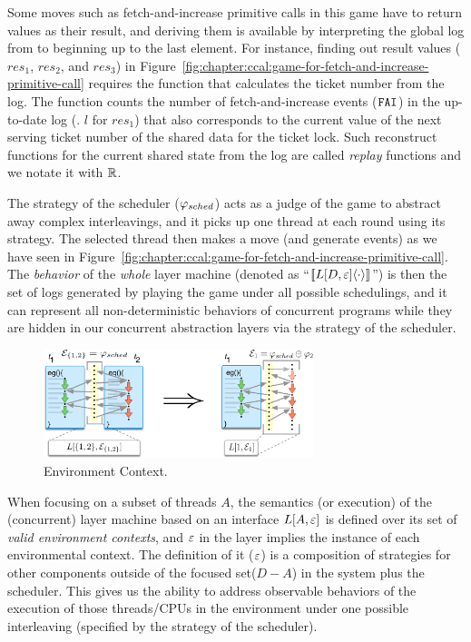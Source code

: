 Some moves such as fetch-and-increase primitive calls in this game have to return values as their result,
and deriving them is available by interpreting the global log from to beginning up to the last element. 
For instance, finding out result values ($res_1$, $res_2$, and $res_3$) in Figure~\ref{fig:chapter:ccal:game-for-fetch-and-increase-primitive-call}
requires the function that calculates the ticket number from the log.
The function counts the number of fetch-and-increase events (${\mathrm{\texttt{FAI}}}$) in the up-to-date log (\eg. $l$ for $res_1$) that
also corresponds to the current value of the next serving ticket number of the shared data for the ticket lock.
Such reconstruct functions for the current shared state from the log are called \emph{replay} functions and we notate it with $\mathbb{R}$.

The strategy of the scheduler ($\varphi_{sched}$) acts as a judge of the game to abstract away complex interleavings, 
and it picks up one thread at each round using its strategy. 
The selected thread then makes a move  (and generate events)  as we have seen in Figure~\ref{fig:chapter:ccal:game-for-fetch-and-increase-primitive-call}.
The \emph{behavior} of the \emph{whole} layer machine (denoted as ``$[\![{L[D, {\varepsilon}]} \langle {\cdot} \rangle]\!]$'') 
is then the set of  logs generated by playing the game under all possible schedulings, and it can represent all non-deterministic behaviors of concurrent programs 
while they are hidden in our concurrent abstraction layers via the strategy of the scheduler.

\begin{figure}[t]
\centering
\includegraphics[width=0.7\textwidth]{figs/ccal/pcomp}
\caption{Environment Context.}
\label{fig:chapter:ccal:env-contexs}
\end{figure}

When focusing on a subset of threads $A$, the semantics (or execution) of the (concurrent) layer machine based on an
interface $L[A, {\varepsilon}]$ is defined over its set of \emph{valid environment
contexts}, and ${\varepsilon}$ in the layer implies the instance of each environmental context.
The definition of it (${\varepsilon}$) is
a composition  of strategies for other components outside of the focused set($D - A$) in the 
system plus the scheduler.
This gives us the ability to address observable behaviors of the
execution of those threads/CPUs in the environment under one possible
interleaving (specified by the strategy of the scheduler).


